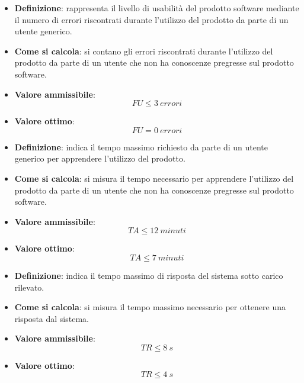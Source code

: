 \hypertarget{21M}{}
\begin{itemize}
	\item \textbf{Definizione}: rappresenta il livello di usabilità del prodotto software mediante il numero di errori riscontrati durante l'utilizzo del prodotto da parte di un utente generico.
	\item \textbf{Come si calcola}: si contano gli errori riscontrati durante l'utilizzo del prodotto da parte di un utente che non ha conoscenze pregresse sul prodotto software.
	\item \textbf{Valore ammissibile}: \begin{equation*}FU \leq 3\ errori\end{equation*}
	\item \textbf{Valore ottimo}: \begin{equation*}FU = 0\ errori\end{equation*}
\end{itemize}

\hypertarget{22M}{}
\begin{itemize}
	\item \textbf{Definizione}: indica il tempo massimo richiesto da parte di un utente generico per apprendere l'utilizzo del prodotto.
	\item \textbf{Come si calcola}: si misura il tempo necessario per apprendere l'utilizzo del prodotto da parte di un utente che non ha conoscenze pregresse sul prodotto software.
	\item \textbf{Valore ammissibile}: \begin{equation*}TA \leq 12\ minuti\end{equation*}
	\item \textbf{Valore ottimo}: \begin{equation*}TA \leq 7\ minuti\end{equation*}
\end{itemize}

\hypertarget{23M}{}
\begin{itemize}
	\item \textbf{Definizione}: indica il tempo massimo di risposta del sistema sotto carico rilevato.
	\item \textbf{Come si calcola}: si misura il tempo massimo necessario per ottenere una risposta dal sistema.
	\item \textbf{Valore ammissibile}: \begin{equation*}TR \leq 8\ s\end{equation*}
	\item \textbf{Valore ottimo}: \begin{equation*}TR \leq 4\ s\end{equation*}
\end{itemize}

